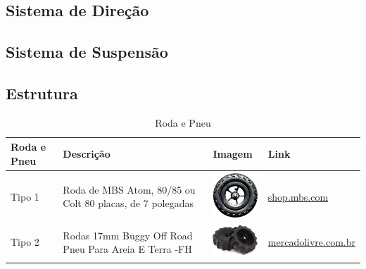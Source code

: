   \vfill
  \pagebreak

  \subsection{Sistema de Direção}
  \subsection{Sistema de Suspensão}
  \subsection{Estrutura}

  \begin{table}[!htbp]
  \begin{center}
  \caption{Roda e Pneu}
  \begin{tabular}{|p{2cm}|p{3cm}|p{2cm}|p{4cm}|}
  \hline
  \textbf{Roda e Pneu} & \textbf{Descrição} & \textbf{Imagem} & \textbf{Link}\\\hline\hline
  Tipo 1 & Roda de MBS Atom, 80/85 ou Colt 80 placas, de 7 polegadas & \includegraphics[width=2cm]{figuras/roda_mbs.eps} & \href{http://shop.mbs.com/accessories-488/mountainboard-wheels/complete-wheels/complete-7-wheel.html}{shop.mbs.com}\\\hline
  Tipo 2 & Rodas 17mm Buggy Off Road Pneu Para Areia E Terra -FH & \includegraphics[width=2cm]{figuras/roda_buggy.eps} & \href{http://produto.mercadolivre.com.br/MLB-788601174-par-de-rodas-17mm-buggy-off-road-pneu-para-areia-e-terra-fh-_JM}{mercadolivre.com.br}\\\hline
  \end{tabular}
  \end{center}
  \end{table}

